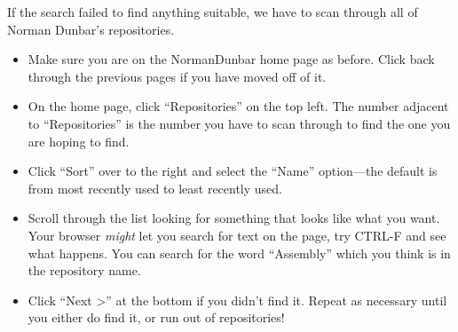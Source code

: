 If the search failed to find anything suitable, we have to scan through all of Norman Dunbar's repositories.

\begin{itemize}
    \item Make sure you are on the NormanDunbar home page as before. Click back through the previous pages if you have moved off of it.
    \item On the home page, click ``Repositories'' on the top left. The number adjacent to ``Repositories'' is the number you have to scan through to find the one you are hoping to find.
    \item Click ``Sort'' over to the right and select the ``Name'' option---the default is from most recently used to least recently used.
    \item Scroll through the list looking for something that looks like what you want. Your browser \emph{might} let you search for text on the page, try CTRL-F and see what happens. You can search for the word ``Assembly'' which you think is in the repository name.
    \item Click ``Next >'' at the bottom if you didn't find it. Repeat as necessary until you either do find it, or run out of repositories!
\end{itemize}
